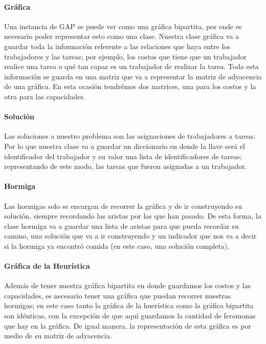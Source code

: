 \documentclass{article}
\begin{document}
    \paragraph{ Gráfica }
    Una instancia de GAP se puede ver como una gráfica bipartita,
    por ende es necesario poder representar esto como una clase.
    Nuestra clase gráfica va a guardar toda la información 
    referente a las relaciones que haya entre los trabajadores y 
    las tareas; por ejemplo, los costos que tiene que un trabajador
    realice una tarea o qué tan capaz es un trabajador de realizar 
    la tarea. Toda esta información se guarda en una matriz que
    va a representar la matriz de adyacencia de una gráfica. En 
    esta ocasión tendrémos dos matrices, una para los costos y la
    otra para las capacidades.

    \paragraph{ Solución }
    Las soluciones a nuestro problema son las asignaciones de 
    trabajadores a tareas. Por lo que nuestra clase va a guardar 
    un diccionario en donde la llave será el identificador 
    del trabajador y su valor una lista de identificadores de tareas;
    representando de este modo, las tareas que fueron asignadas 
    a un trabajador.

    \paragraph{ Hormiga }
    Las hormigas solo se encargan de recorrer la gráfica y de ir 
    construyendo su solución, siempre recordando las aristas por las
    que han pasado. De esta forma, la clase hormiga va a guardar 
    una lista de aristas para que pueda recordar su camino, una 
    solución que va a ir construyendo y un indicador que nos va
    a decir si la hormiga ya encontró comida (en este caso, 
    una solución completa).

    \paragraph{ Gráfica de la Heurística }
    Además de tener nuestra gráfica bipartita en donde guardamos
    los costos y las capacidades, es necesario tener una gráfica
    que puedan recorrer nuestras hormigas; en este caso tanto 
    la gráfica de la huerística como la gráfica bipartita son
    idénticas, con la excepción de que aquí guardamos la cantidad
    de feromonas que hay en la gráfica. De igual manera, la 
    representación de esta gráfica es por medio de su matriz
    de adyacencia.
\end{document}
